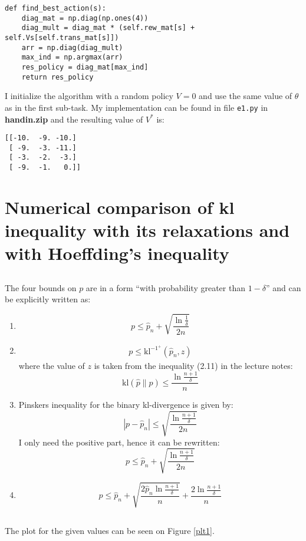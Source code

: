 \documentclass[a4paper]{article}
\begin{document}
\begin{lstlisting}[caption="Calculation of argmax\_a", label=lst1]
def find_best_action(s):
    diag_mat = np.diag(np.ones(4))
    diag_mult = diag_mat * (self.rew_mat[s] + self.Vs[self.trans_mat[s]])
    arr = np.diag(diag_mult)
    max_ind = np.argmax(arr)
    res_policy = diag_mat[max_ind]
    return res_policy
\end{lstlisting}
I initialize the algorithm with a random policy $V=0$ and use the same value of
$\theta$ as in the first sub-task. My implementation can be found in file
\texttt{e1.py} in \textbf{handin.zip} and the resulting value of $V^{*}$ is:
\begin{verbatim}
[[-10.  -9. -10.]
 [ -9.  -3. -11.]
 [ -3.  -2.  -3.]
 [ -9.  -1.   0.]]
\end{verbatim}


\section{Numerical comparison of kl inequality with its relaxations and with Hoeffding’s inequality}
\subsection{}
\label{subsec:21}
The four bounds on $p$ are in a form ``with probability greater than $1 - \delta$'' and can
be explicitly written as:
\begin{enumerate}
\item $$p \leq \hat{p}_n+\sqrt{\frac{\ln \frac{1}{\delta}}{2 n}}$$
\item
  \begin{align*}
  p \leq \mathrm{kl}^{-1^{+}}\left(\hat{p}_{n}, z\right)
  \end{align*}
  where the value of $z$ is taken from the inequality (2.11) in the lecture notes:
  $$ \mathrm{kl}(\hat{p} \| p) \leq \frac{\ln \frac{n+1}{\delta}}{n} $$
\item Pinskers inequality for the binary kl-divergence is given by:
  $$|p-\hat{p}_n| \leq \sqrt{\frac{\ln \frac{n+1}{\delta}}{2 n}}$$
  I only need the positive part, hence it can be rewritten:
  $$p \leq \hat{p}_n + \sqrt{\frac{\ln \frac{n+1}{\delta}}{2 n}}$$
\item $$ p \leq \hat{p}_n+\sqrt{\frac{2 \hat{p}_n \ln \frac{n+1}{\delta}}{n}}+\frac{2
  \ln \frac{n+1}{\delta}}{n}$$
\end{enumerate}

\subsection{}
\label{subsec:22}
The plot for the given values can be seen on Figure \ref{plt1}.
\end{document}

